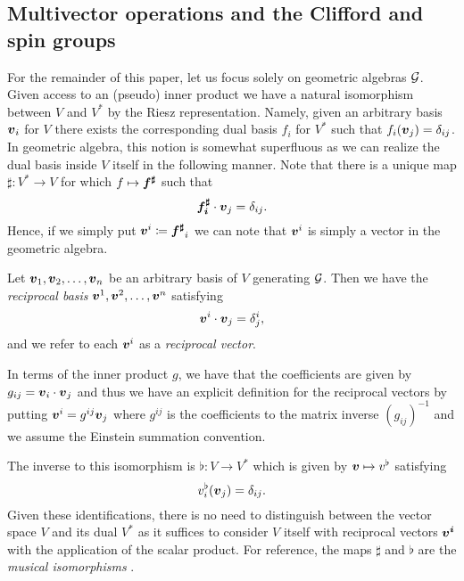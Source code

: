 \subsection{Multivector operations and the Clifford and spin groups}
\label{subsec:clifford_spin_groups}
For the remainder of this paper, let us focus solely on geometric algebras $\mathcal{G}$. Given access to an (pseudo) inner product we have a natural isomorphism between $V$ and $V^*$ by the Riesz representation.  Namely, given an arbitrary basis $\boldsymbol{v}_i$ for $V$ there exists the corresponding dual basis $f_i$ for $V^*$ such that $f_i(\boldsymbol{v}_j)=\delta_{ij}$. In geometric algebra, this notion is somewhat superfluous as we can realize the dual basis inside $V$ itself in the following manner. Note that there is a unique map $\sharp \colon V^* \to V$ for which $f\mapsto \boldsymbol{f^\sharp}$ such that
\begin{equation}
\boldsymbol{f_i^\sharp} \cdot \boldsymbol{v}_j = \delta_{ij}.
\end{equation}
Hence, if we simply put $\boldsymbol{v}^i \coloneqq \boldsymbol{f^\sharp}_i$ we can note that $\boldsymbol{v}^i$ is simply a vector in the geometric algebra.
\begin{definition}
Let $\boldsymbol{v}_1,\boldsymbol{v}_2,\dots,\boldsymbol{v}_n$ be an arbitrary basis of $V$ generating $\mathcal{G}$. Then we have the \emph{reciprocal basis} $\boldsymbol{v}^1,\boldsymbol{v}^2,\dots,\boldsymbol{v}^n$ satisfying
\begin{equation}
    \boldsymbol{v}^i\cdot \boldsymbol{v}_j = \delta^i_j,
\end{equation}
and we refer to each $\boldsymbol{v}^i$ as a \emph{reciprocal vector}.
\end{definition}
In terms of the inner product $g$, we have that the coefficients are given by $g_{ij}=\boldsymbol{v}_i\cdot \boldsymbol{v}_j$ and thus we have an explicit definition for the reciprocal vectors by putting $\boldsymbol{v}^i = g^{ij}\boldsymbol{v}_j$ where $g^{ij}$ is the coefficients to the matrix inverse $(g_{ij})^{-1}$ and we assume the Einstein summation convention. 

The inverse to this isomorphism is $\flat \colon V \to V^*$ which is given by $\boldsymbol{v} \mapsto v^\flat$ satisfying
\begin{equation}
v_i^\flat (\boldsymbol{v}_j)= \delta_{ij}.
\end{equation}
Given these identifications, there is no need to distinguish between the vector space $V$ and its dual $V^*$ as it suffices to consider $V$ itself with reciprocal vectors $\boldsymbol{v^i}$ with the application of the scalar product. For reference, the maps $\sharp$ and $\flat$ are the \emph{musical isomorphisms} .


